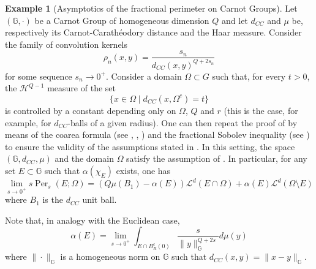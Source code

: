 \documentclass[reqno,11pt]{amsart}
\numberwithin{equation}{section}
\theoremstyle{definition} %
\newtheorem{example}{Example}[section]
\theoremstyle{plain}
\theoremstyle{definition}
\theoremstyle{remark}
\def\norma#1#2{ \|#1 \|_{#2}}
\begin{document}
\begin{example}[Asymptotics of the fractional perimeter on Carnot Groups]
    Let $(\mathbb G,\cdot)$ be a Carnot Group of homogeneous dimension $Q$ and let $d_{CC}$ and $\mu$ be, respectively its Carnot-Carath\'eodory distance and the Haar measure. Consider the family of convolution kernels
    \[
    \rho_n(x,y)=\frac{s_n}{d_{CC}(x,y)^{Q+2s_n}}
    \]
    for some sequence $s_n\to0^+$.
    Consider a domain $\Omega\subset G$ such that, for every $t>0$, the $\mathcal{H}^{Q-1}$ measure of the set
    \[
    \{x\in\Omega\mid d_{CC}(x,\Omega^c)=t\}
    \]
    is controlled by a constant depending only on $\Omega$, $Q$ and $r$ (this is the case, for example, for $d_{CC}$-balls of a given radius).
    One can then repeat the proof of  by means of the coarea formula (see \cite[Theorem 2.4]{BNP-BVfunctionsonPI}, \cite{AdM-Equiv-BV}, \cite{Miranda-BV}) and the fractional Sobolev inequality (see \cite{FracPoincMetric}) to ensure the validity of the assumptions stated in .
    In this setting, the space $(\mathbb G,d_{CC},\mu)$ and the domain $\Omega$ satisfy the assumption of .
    In particular, for any set $E\subset \mathbb G$ such that $\alpha(\chi_E)$ exists, one has
    \[
    \lim_{s\to0^+} s\operatorname{Per}_s(E;\Omega)= (Q\mu(B_1)-\alpha(E)) \mathcal{L}^d(E\cap \Omega)+\alpha(E)\mathcal{L}^d(\Omega\setminus E)
    \]
    where $B_1$ is the $d_{CC}$ unit ball.
    
    Note that, in analogy with the Euclidean case,
    \[
    \alpha(E)=\lim_{s\to0^+}\int_{E\cap B_R^c(0)}\frac{s}{\norma{y}{\mathbb{G}}^{Q+2s}}d\mu(y)
    \]
    where $\norma{\cdot}{\mathbb G}$ is a homogeneous norm on $\mathbb{G}$ such that $d_{CC}(x,y)=\norma{x-y}{\mathbb{G}}$. 
\end{example}
\end{document}
